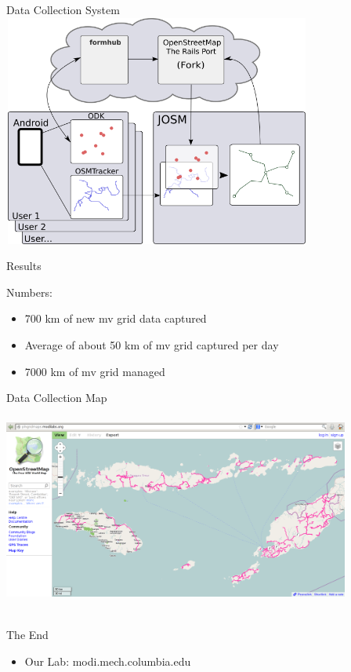\documentclass{beamer}
\begin{document}
\begin{frame}{Data Collection System}
  \includegraphics[width=4in,height=3in]{../diagrams/gridmaps-design.png}
\end{frame}

\begin{frame}{Results}

  Numbers:
  \begin{itemize}
  \item[] 700 km of new mv grid data captured
  \item[] Average of about 50 km of mv grid captured per day
  \item[] 7000 km of mv grid managed 
  \end{itemize}
  
\end{frame}

\begin{frame}{Data Collection Map}
  \includegraphics[width=4.5in,height=2.75in]{../diagrams/gridmaps-indo.png}
\end{frame}

\begin{frame}{The End}

  \begin{itemize}
  \item[] Our Lab:  modi.mech.columbia.edu
  \end{itemize}
 
\end{frame}
\end{document}
